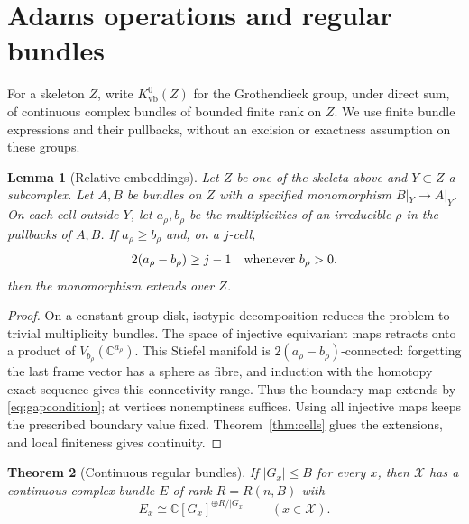 \documentclass[11pt,a4paper,reqno]{amsart}
\numberwithin{equation}{section}
\newtheorem{theorem}{Theorem}[section]
\newtheorem{lemma}[theorem]{Lemma}
\theoremstyle{remark}
\theoremstyle{plain}
\newcommand{\X}{\mathcal X}
\newcommand{\C}{\mathbb C}
\begin{document}
\section{Adams operations and regular bundles}\label{sec:adams}

For a skeleton $Z$, write $K^0_{\mathrm{vb}}(Z)$ for the Grothendieck group,
under direct sum, of continuous complex bundles of bounded finite rank on
$Z$. We use finite bundle expressions and their pullbacks, without an
excision or exactness assumption on these groups.

\begin{lemma}[Relative embeddings]\label{lem:embedding}
Let $Z$ be one of the skeleta above and $Y\subset Z$ a subcomplex. Let
$A,B$ be bundles on $Z$ with a specified monomorphism $B|_Y\to A|_Y$. On each cell outside $Y$, let
$a_\rho,b_\rho$ be the multiplicities of an irreducible $\rho$ in the
pullbacks of $A,B$. If $a_\rho\geq b_\rho$ and, on a $j$-cell,
\begin{equation}\label{eq:gapcondition}
 2(a_\rho-b_\rho)\geq j-1
 \quad\hbox{whenever }b_\rho>0.
\end{equation}
then the monomorphism extends over $Z$.
\end{lemma}

\begin{proof}
On a constant-group disk, isotypic decomposition reduces the problem to
trivial multiplicity bundles. The space of injective equivariant maps
retracts onto a product of $V_{b_\rho}(\C^{a_\rho})$. This Stiefel
manifold is $2(a_\rho-b_\rho)$-connected: forgetting the last frame vector
has a sphere as fibre, and induction with the homotopy exact sequence gives
this connectivity range. Thus the boundary map extends by
\eqref{eq:gapcondition}; at vertices nonemptiness suffices. Using all
injective maps keeps the prescribed boundary value fixed.
Theorem~\ref{thm:cells} glues the extensions, and local finiteness gives
continuity.
\end{proof}

\begin{theorem}[Continuous regular bundles]\label{thm:regular}
If $|G_x|\leq B$ for every $x$, then $\X$ has a continuous complex bundle
$E$ of rank $R=R(n,B)$ with
\[
 E_x\cong\C[G_x]^{\oplus R/|G_x|}
 \qquad(x\in\X).
\]
\end{theorem}
\end{document}

